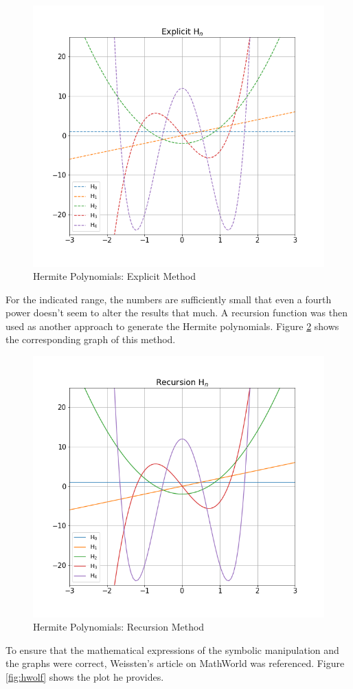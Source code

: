 \documentclass[twocolumn]{article}
\begin{document}
\begin{figure}[h!]
  \centering
  \includegraphics[scale = 0.4]{hexplicit}
  \caption{Hermite Polynomials: Explicit Method}
  \label{fig:hexp}
\end{figure}
For the indicated range, the numbers are sufficiently small that even a fourth power doesn't seem to alter the results that much. 
\vfill\eject
A recursion function was then used as another approach to generate the Hermite polynomials. Figure \ref{fig:hrec} shows the corresponding graph of this method.

\begin{figure}[h!]
  \centering
  \includegraphics[scale = 0.4]{hrecursion}
  \caption{Hermite Polynomials: Recursion Method}
  \label{fig:hrec}
\end{figure}
To ensure that the mathematical expressions of the symbolic manipulation and the graphs were correct, Weissten's article on MathWorld was referenced. 
Figure \ref{fig:hwolf} shows the plot he provides.
\end{document}
